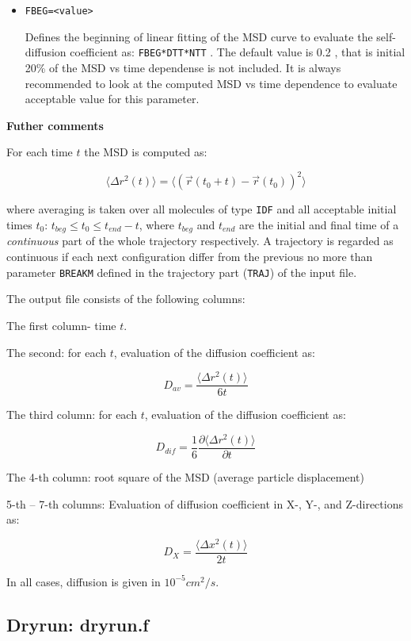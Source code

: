 \documentclass{article}
\begin{document}
\begin{itemize}
\item
\verb|FBEG=<value>|

Defines the beginning of linear fitting of the MSD curve to evaluate the
self-diffusion coefficient as:  \verb|FBEG*DTT*NTT| . The default value
is 0.2 , that is initial 20\% of the MSD vs time dependense is not
included. It is always recommended to look at the computed MSD vs time
dependence to evaluate acceptable value for this parameter.

\end{itemize}

{\bf Futher comments}

For each time $t$ the MSD is computed as:

\begin{equation}
\label{diffusion}
\langle \Delta r^2(t)\rangle = \langle (\vec{r}(t_0+t)-\vec{r}(t_0))^2\rangle
\end{equation}

where averaging is taken over all molecules of type \verb|IDF| and all
acceptable initial times $t_0$:   $t_{beg} \le t_0 \le t_{end}-t$, where
$t_{beg}$ and $t_{end}$ are the initial and final time of a {\it continuous}
part of the whole trajectory respectively. A trajectory is regarded as 
continuous if each next configuration differ from the previous no more
than parameter \verb|BREAKM| defined in the trajectory part (\verb|TRAJ|)
of the input file.

The output file consists of the following columns:

The first column- time $t$.

The second: for each $t$, evaluation of the diffusion coefficient as:

$$D_{av} = \frac{\langle \Delta r^2(t)\rangle}{6t}$$

The third column: for each $t$, evaluation of the diffusion coefficient as:

$$D_{dif} = \frac{1}{6}\frac{\partial\langle \Delta r^2(t)\rangle}{\partial t}$$

The 4-th column: root square of the MSD (average particle displacement)

5-th -- 7-th columns: Evaluation of diffusion coefficient in X-, Y-, and 
Z-directions as:  
  
$$D_{X} = \frac{\langle \Delta x^2(t)\rangle}{2t}$$

In all cases, diffusion is given in $10^{-5}cm^2/s$.

\subsection{Dryrun: dryrun.f}
\end{document}
